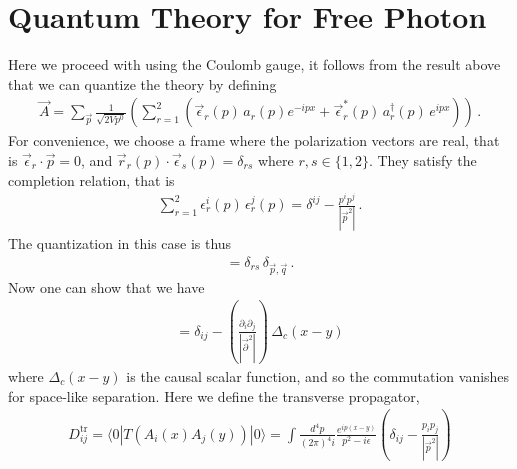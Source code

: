 \documentclass[11pt, onesided]{book}
\theoremstyle{break}
\theoremstyle{break}
\newcommand{\pd}{\partial}
\begin{document}
\newpage
\section[Quantum Theory for Free Photon]{\color{red}
Quantum Theory for Free Photon\color{black}}
Here we proceed with using the Coulomb gauge, it follows from the result above that we can quantize the theory by defining
\begin{align*}
\vec{A} = \sum_{\vec{p}} \frac{1}{\sqrt{2V p^0}}\left( \sum_{r=1}^2\left(
\vec{\epsilon}_r(p)\, a_r(p) e^{-ipx} + \vec{\epsilon}_r^*(p) \, a_r^\dagger(p)\, e^{ipx}\right)\right)\,.
\end{align*}
For convenience, we choose a frame where the polarization vectors are real, that is $\vec{\epsilon}_r \cdot \vec{p} = 0$, and $\vec{r}_r(p) \cdot \vec{\epsilon}_s(p) = \delta_{rs}$ where $r,s \in \{1,2\}$. They satisfy the completion relation, that is
\begin{align*}
\sum_{r=1}^2 \epsilon_r^i(p) \, \epsilon_r^j(p) = \delta^{ij} - \frac{p^i p^j}{|\vec{p}^2|}\,.
\end{align*}
The quantization in this case is thus
\begin{align*}
[a_r(p) ,\, a_s^\dagger(q)] = \delta_{rs}\, \delta_{\vec{p}, \vec{q}}\,.
\end{align*}
Now one can show that we have
\begin{align*}
[A_i(x),\, A_j(y)] = \delta_{ij} - \left(\frac{\pd_i \pd_j}{|\vec{\pd}^2|}\right)\, \Delta_c(x-y)
\end{align*}
where $\Delta_c(x-y)$ is the causal scalar function, and so the commutation vanishes for space-like separation. Here we define the transverse propagator, 
\begin{align*}
D_{ij}^{\text{tr}} = \langle 0 | T(A_i(x) A_j(y))|0\rangle = \int \frac{d^4p}{(2\pi)^4 i} \frac{e^{ip(x-y)}}{p^2 - i\epsilon}\left( \delta_{ij} - \frac{p_i p_j}{|\vec{p}^2|}\right)
\end{align*}
\end{document}
